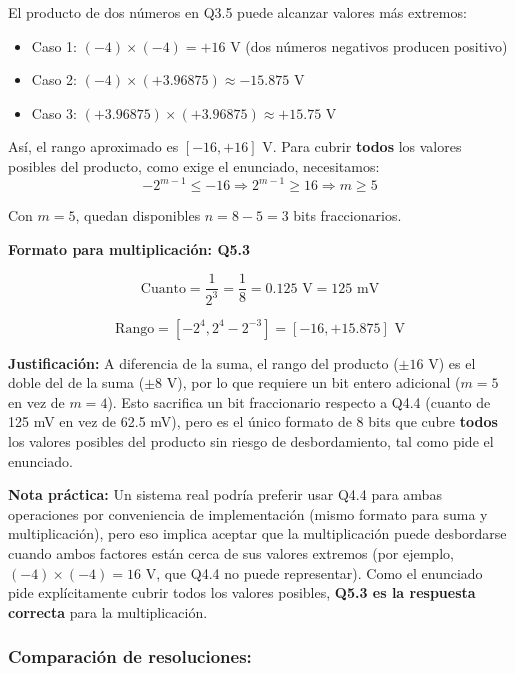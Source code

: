 \documentclass[12pt]{article}
\begin{document}
El producto de dos números en Q3.5 puede alcanzar valores más extremos:
\begin{itemize}
    \item Caso 1: $(-4) \times (-4) = +16$ V (dos números negativos producen positivo)
    \item Caso 2: $(-4) \times (+3.96875) \approx -15.875$ V
    \item Caso 3: $(+3.96875) \times (+3.96875) \approx +15.75$ V
\end{itemize}
 
Así, el rango aproximado es $[-16, +16]$ V. Para cubrir \textbf{todos} los valores posibles del producto, como exige el enunciado, necesitamos:
\begin{equation}
-2^{m-1} \leq -16 \Rightarrow 2^{m-1} \geq 16 \Rightarrow m \geq 5
\end{equation}

Con $m = 5$, quedan disponibles $n = 8 - 5 = 3$ bits fraccionarios.

\textbf{Formato para multiplicación: Q5.3}

\begin{equation}
\text{Cuanto} = \frac{1}{2^3} = \frac{1}{8} = 0.125 \text{ V} = 125 \text{ mV}
\end{equation}

\begin{equation}
\text{Rango} = \left[-2^{4}, 2^{4} - 2^{-3}\right] = [-16, +15.875] \text{ V}
\end{equation}

\textbf{Justificación:} A diferencia de la suma, el rango del producto ($\pm 16$ V) es el doble del de la suma ($\pm 8$ V), por lo que requiere un bit entero adicional ($m=5$ en vez de $m=4$). Esto sacrifica un bit fraccionario respecto a Q4.4 (cuanto de 125 mV en vez de 62.5 mV), pero es el único formato de 8 bits que cubre \textbf{todos} los valores posibles del producto sin riesgo de desbordamiento, tal como pide el enunciado.

\textbf{Nota práctica:} Un sistema real podría preferir usar Q4.4 para ambas operaciones por conveniencia de implementación (mismo formato para suma y multiplicación), pero eso implica aceptar que la multiplicación puede desbordarse cuando ambos factores están cerca de sus valores extremos (por ejemplo, $(-4)\times(-4)=16$ V, que Q4.4 no puede representar). Como el enunciado pide explícitamente cubrir todos los valores posibles, \textbf{Q5.3 es la respuesta correcta} para la multiplicación.
 
\subsubsection*{Comparación de resoluciones:}
 
\end{document}
